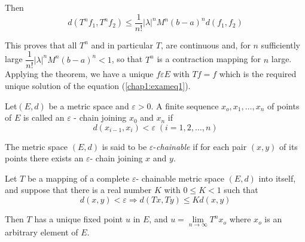 Then 
$$
d(T^n f_1 , T^n f_2 ) \leq \frac{1}{n!} |\lambda|^n M^n (b-a)^n d
(f_1, f_2) 
$$

This proves that all $T^n$ and in particular $T$, are continuous and,
for $n$ sufficiently large $\dfrac{1}{n!} |\lambda|^n M^n (b-a)^n <
1$, so that $T^n$ is a contraction mapping for $n$ large. Applying the
theorem, we have a unique $f \varepsilon E$ with $Tf = f$ which is the
required unique solution of the equation (\ref{chap1:exameq1}).  

\begin{Definition}%
  Let\pageoriginale $(E, d)$ be a metric space and $\varepsilon >
  0$. A finite sequence 
  $x_o, x_1, \ldots, x_n$ of points of $E$ is called an $\varepsilon$ - chain
  joining $x_0$ and $x_n$ if  
  $$
  d (x_{i-1}, x_i) < \varepsilon \; (i=1, 2, \ldots, n)
  $$
\end{Definition}

The metric space $(E, d)$ is said to be $\varepsilon$-\textit{chainable} if
for each pair $(x,y)$ of its points there exists an $\varepsilon$- chain
joining $x$ and $y$. 

\begin{thmm}[Edelstein]\label{chap1:thm1.4}%
  Let $T$ be a mapping of a complete $\varepsilon$- chainable
  metric space $(E, d)$ into itself, and suppose that there is a real
  number $K$ with $0 \leq K < 1$ such that 
  $$
  d(x,y) < \varepsilon \Rightarrow d (Tx , Ty) \leq K d(x,y)
  $$
\end{thmm}

Then $T$ has a unique fixed point $u$ in $E$, and $u =  \lim\limits_{n
  \to \infty} T^n x_o$ where $x_o $ is an arbitrary element of $E$. 

